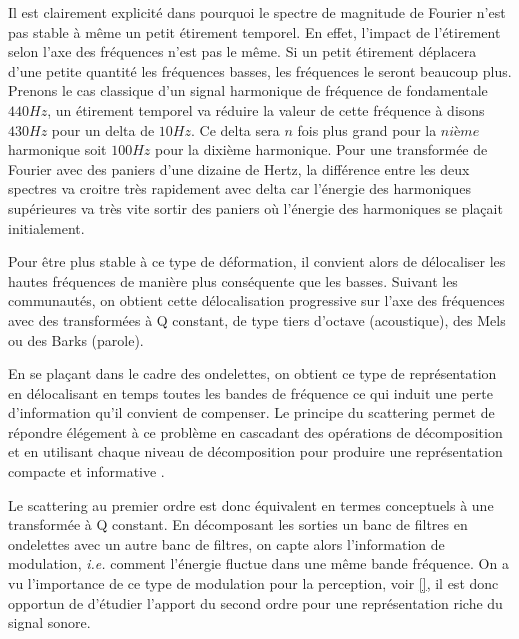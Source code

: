 Il est clairement explicité dans \cite{anden2014deep} pourquoi le spectre de magnitude de Fourier n'est pas stable à même un petit étirement temporel. En effet, l'impact de l'étirement selon l'axe des fréquences n'est pas le même. Si un petit étirement déplacera d'une petite quantité les fréquences basses, les fréquences le seront beaucoup plus. Prenons le cas classique d'un signal harmonique de fréquence de fondamentale $440 Hz$, un étirement temporel va réduire la valeur de cette fréquence à disons $430 Hz$ pour un delta de $10 Hz$. Ce delta sera $n$ fois plus grand pour la $nième$ harmonique soit $100 Hz$ pour la dixième harmonique. Pour une transformée de Fourier avec des paniers d'une dizaine de Hertz, la différence entre les deux spectres va croitre très rapidement avec delta car l'énergie des harmoniques supérieures va très vite sortir des paniers où l'énergie des harmoniques se plaçait initialement.

Pour être plus stable à ce type de déformation, il convient alors de \og délocaliser \fg les hautes fréquences de manière plus conséquente que les basses. Suivant les communautés, on obtient cette délocalisation progressive sur l'axe des fréquences avec des transformées à Q constant, de type tiers d'octave (acoustique), des Mels ou des Barks (parole).

En se plaçant dans le cadre des ondelettes, on obtient ce type de représentation en délocalisant en temps toutes les bandes de fréquence ce qui induit une perte d'information qu'il convient de compenser. Le principe du scattering permet de répondre élégement à ce problème en cascadant des opérations de décomposition et en utilisant chaque niveau de décomposition pour produire une représentation compacte et informative .

Le scattering au premier ordre est donc équivalent en termes conceptuels à une transformée à Q constant. En décomposant les sorties un banc de filtres en ondelettes avec un autre banc de filtres, on capte alors l'information de modulation, \textit{i.e.} comment l'énergie fluctue dans une même bande fréquence. On a vu l'importance de ce type de modulation pour la perception, voir \ref{}, il est donc opportun de d'étudier l'apport du second ordre pour une représentation riche du signal sonore.

